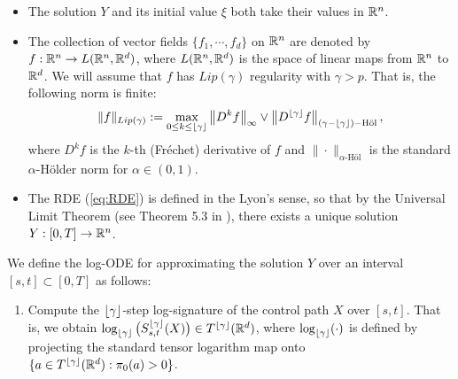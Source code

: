 \begin{theorem}
\begin{itemize}
\item The solution $Y$ and its initial value $\xi$ both take their values in $\mathbb{R}^n$.

\item The collection of vector fields $\{f_1, \cdots, f_d\}$ on $\mathbb{R}^n$ are denoted by $f : \mathbb{R}^n\rightarrow L(\mathbb{R}^n, \mathbb{R}^d)$,
where $L(\mathbb{R}^n, \mathbb{R}^d)$ is the space of linear maps from $\mathbb{R}^n$ to $\mathbb{R}^d$. We will assume that $f$ has $Lip(\gamma)$ regularity with $\gamma > p$.
That is, the following norm is finite:
\begin{equation}
\|f\|_{Lip(\gamma)} := \max_{0 \leq k\leq \lfloor \gamma \rfloor}\big\|D^k f\big\|_{\infty} \vee \big\|D^{\lfloor \gamma \rfloor} f\big\|_{(\gamma - \lfloor \gamma \rfloor)-\text{H\"{o}l}}\,,
\label{eq:lipgamma}
\end{equation}
where $D^k f$ is the $k$-th (Fr\'{e}chet) derivative of $f$ and $\|\cdot\|_{\alpha\text{-H\"{o}l}}$ is the standard $\alpha$-H\"{o}lder norm for $\alpha\in(0,1)$.

\item The RDE (\ref{eq:RDE}) is defined in the Lyon's sense, so that by the Universal Limit Theorem
(see Theorem 5.3 in \cite{roughpath2007notes}), there exists a unique solution $Y : [0,T]\rightarrow\mathbb{R}^n$.
\end{itemize}

We define the log-ODE for approximating the solution $Y$ over an interval $[s,t]\subset [0,T]$ as follows: 
\begin{enumerate}
\item Compute the $\lfloor \gamma \rfloor$-step log-signature of the control path $X$ over $[s,t]$. That is, we obtain $\log_{\lfloor \gamma \rfloor}\big(S_{s,t}^{\lfloor \gamma \rfloor}(X)\big) \in T^{\lfloor \gamma \rfloor}(\mathbb{R}^d)$, where $\log_{\lfloor \gamma \rfloor}(\cdot)$ is defined by projecting the standard tensor logarithm map onto $\{a\in T^{\lfloor \gamma \rfloor}(\mathbb{R}^d) : \pi_0(a)>0\}$.


\end{enumerate}
\end{theorem}
